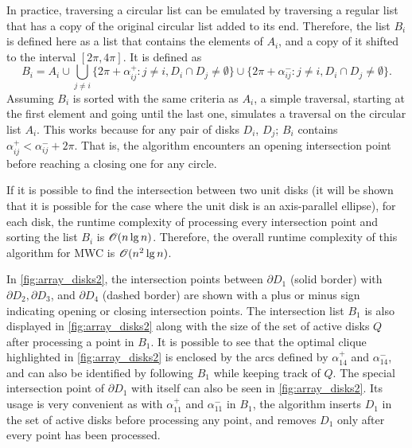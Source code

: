 In practice, traversing a circular list can be emulated by traversing a regular list that has a copy of the original circular list added to its end. 
Therefore, the list $B_i$ is defined here as a list that contains the elements of $A_i$, and a copy of it shifted to the interval $[2\pi, 4\pi]$. It is defined as
\begin{equation}\label{eq:bi2}
B_i = A_i\cup\bigcup_{j\neq i} \{2\pi+\alpha_{ij}^+ \colon j\neq i, D_i \cap D_j \neq \emptyset\} \cup \{2\pi+\alpha_{ij}^- \colon j\neq i, D_i \cap D_j \neq \emptyset \}.
\end{equation}
Assuming $B_i$ is sorted with the same criteria as $A_i$, a simple traversal, starting at the first element and going until the last one, simulates a traversal on the circular list $A_i$.
This works because for any pair of disks $D_i$, $D_j$; $B_i$ contains $\alpha_{ij}^+ < \alpha_{ij}^- + 2\pi$. That is, the algorithm encounters an opening intersection point before reaching a closing one for any circle.

If it is possible to find the intersection between two unit disks (it will be shown that it is possible for the case where the unit disk is an axis-parallel ellipse), for each disk, the runtime complexity of processing every intersection point and sorting the list $B_i$ is $\mathscr{O}(n\lg{n})$. Therefore, the overall runtime complexity of this algorithm for MWC is $\mathscr{O}(n^2\lg{n})$.

In \autoref{fig:array_disks2}, the intersection points between $\partial D_1$ (solid border) with $\partial D_2, \partial D_3$, and $\partial D_4$ (dashed border) are shown with a plus or minus sign indicating opening or closing intersection points. 
The intersection list $B_1$ is also displayed in \autoref{fig:array_disks2} along with the size of the set of active disks $Q$ after processing a point in $B_1$.
It is possible to see that the optimal clique highlighted in \autoref{fig:array_disks2} is enclosed by the arcs defined by $\alpha_{14}^+$ and $\alpha_{14}^-$, and can also be identified by following $B_1$ while keeping track of $Q$.
The special intersection point of $\partial D_1$ with itself can also be seen in \autoref{fig:array_disks2}. Its usage is very convenient as with $\alpha_{11}^+$ and $\alpha_{11}^-$  in $B_1$, the algorithm inserts $D_1$ in the set of active disks before processing any point, and removes $D_1$ only after every point has been processed.

